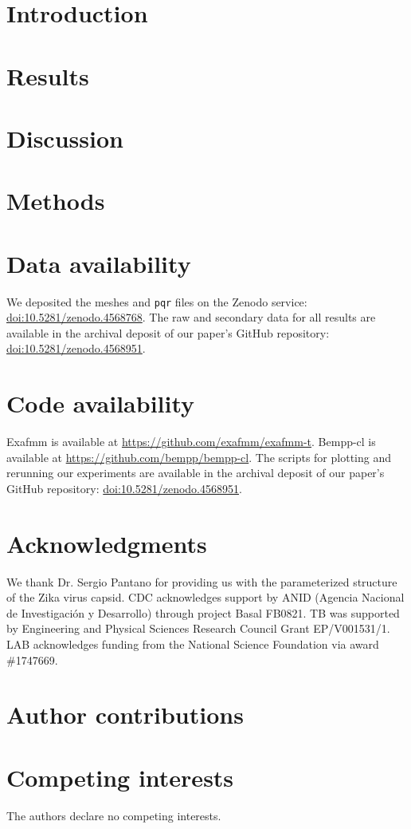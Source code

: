 \documentclass[twocolumn]{article}
\begin{document}
\section{Introduction}\label{sec:intro}


\section{Results}\label{sec:results}


\section{Discussion} \label{sec:discussion}


\small{
\section{Methods}\label{sec:methods}



}

\section{Data availability}
We deposited the meshes and \texttt{pqr} files on the Zenodo service: \href{http://doi.org/10.5281/zenodo.4568768}{doi:10.5281/zenodo.4568768}.
The raw and secondary data for all results are available in the archival deposit of our paper’s GitHub repository: \href{http://doi.org/10.5281/zenodo.4568951}{doi:10.5281/zenodo.4568951}.

\section{Code availability}
Exafmm is available at \href{https://github.com/exafmm/exafmm-t}{https://github.com/exafmm/exafmm-t}.
Bempp-cl is available at \href{https://github.com/bempp/bempp-cl}{https://github.com/bempp/bempp-cl}.
The scripts for plotting and rerunning our experiments are available in the archival deposit of our paper’s GitHub repository: \href{http://doi.org/10.5281/zenodo.4568951}{doi:10.5281/zenodo.4568951}.

{}


\section*{Acknowledgments}
We thank Dr. Sergio Pantano for providing us with the parameterized structure of the Zika virus capsid.
CDC acknowledges support by ANID (Agencia Nacional de Investigaci\'{o}n y Desarrollo) through project Basal FB0821.
TB was supported by Engineering and Physical Sciences Research Council Grant EP/V001531/1.
LAB acknowledges funding from the National Science Foundation via award \#1747669.

\section*{Author contributions}

\section*{Competing interests}
The authors declare no competing interests.
\end{document}
